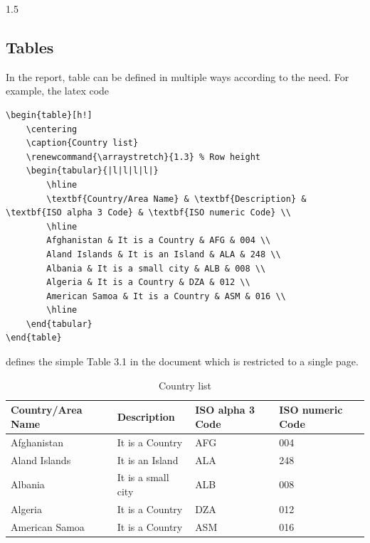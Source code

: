 \begin{spacing}{1.5}
\subsection{Tables}
In the report, table can be defined in multiple ways according to the need.  For example, the latex code
{\scriptsize
\begin{verbatim}
\begin{table}[h!]
	\centering
	\caption{Country list}
	\renewcommand{\arraystretch}{1.3} % Row height
	\begin{tabular}{|l|l|l|l|}
		\hline
		\textbf{Country/Area Name} & \textbf{Description} & \textbf{ISO alpha 3 Code} & \textbf{ISO numeric Code} \\
		\hline
		Afghanistan & It is a Country & AFG & 004 \\
		Aland Islands & It is an Island & ALA & 248 \\
		Albania & It is a small city & ALB & 008 \\
		Algeria & It is a Country & DZA & 012 \\
		American Samoa & It is a Country & ASM & 016 \\
		\hline
	\end{tabular}
\end{table}
\end{verbatim}
}
defines the simple Table 3.1 in the document which is restricted to a single page.
\begin{table}[h!]
\centering
\caption{Country list}
\renewcommand{\arraystretch}{1.3} %
\begin{tabular}{|l|l|l|l|}
\hline
\textbf{Country/Area Name} & \textbf{Description} & \textbf{ISO alpha 3 Code} & \textbf{ISO numeric Code} \\
\hline
Afghanistan & It is a Country & AFG & 004 \\
Aland Islands & It is an Island & ALA & 248 \\
Albania & It is a small city & ALB & 008 \\
Algeria & It is a Country & DZA & 012 \\
American Samoa & It is a Country & ASM & 016 \\
\hline
\end{tabular}
\end{table}

\pagebreak


\end{spacing}
